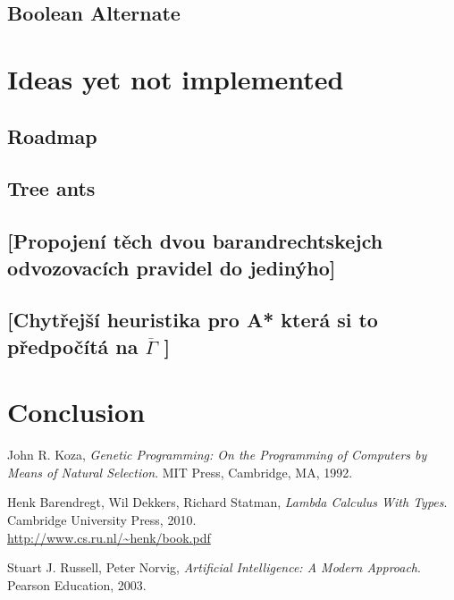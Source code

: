 \documentclass[12pt,a4paper]{report}
\begin{document}
		\section{Boolean Alternate}
	
\chapter{Ideas yet not implemented}

\section{Roadmap}
\section{Tree ants}
\section{[Propojení těch dvou barandrechtskejch odvozovacích pravidel do jedinýho]}
\section{[Chytřejší heuristika pro A* která si to předpočítá na $\overline{\Gamma}$ ]}





\chapter*{Conclusion}
	

\begin{thebibliography}{9}



  John R. Koza,
  \emph{Genetic Programming: On the Programming of Computers by Means of Natural Selection}.
  MIT Press, Cambridge, MA,
  1992. 


  Henk Barendregt, Wil Dekkers, Richard Statman,
  \emph{Lambda Calculus With Types}.
  Cambridge University Press,
  2010. \\
  \url{http://www.cs.ru.nl/~henk/book.pdf}



	Stuart J. Russell, Peter Norvig,
	\emph{Artificial Intelligence: A Modern Approach}.
	Pearson Education,
	2003. 

\end{thebibliography}

	
	
\end{document}
